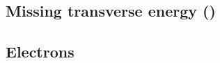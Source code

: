 %  
% 
% 
% 
% 

\subsection{Missing transverse energy \texorpdfstring{(\MET)}{}}


\subsection{Electrons}

